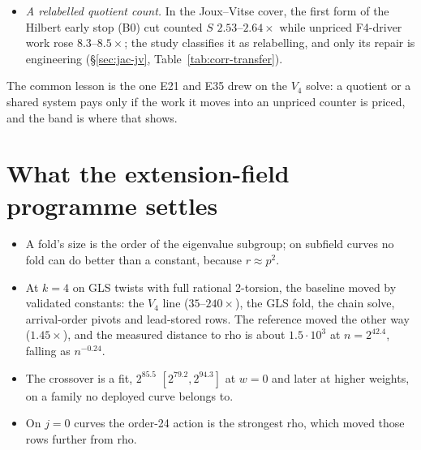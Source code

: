 \begin{itemize}
  would at most filter the eight cofactor lifts by a constant factor 2 or 4;
  a check on the $k=20$ Curve25519 miniature found the ``bits'' base in both
  descent classes (36\%/64\% at $t=5$, 40\%/60\% at $t=6$, 47\%/53\% at
  $t=9$), so no lift is excluded
  (). All
  values are \texttt{[pcc:unverified]}; there is no cost or rho
  comparison.
\item \emph{A relabelled quotient count.} In the Joux--Vitse cover, the
  first form of the Hilbert early stop (B0) cut counted $S$ $2.53$--$2.64\times$
  while unpriced F4-driver work rose $8.3$--$8.5\times$; the study classifies it as
  relabelling, and only its repair is engineering (\S\ref{sec:jac-jv},
  Table~\ref{tab:corr-transfer}).
\end{itemize}
The common lesson is the one E21 and E35 drew on the $V_4$ solve: a quotient
or a shared system pays only if the work it moves into an unpriced counter is
priced, and the band is where that shows.

\section{What the extension-field programme settles}\label{sec:glv-summary}

\begin{itemize}
\item A fold's size is the order of the eigenvalue subgroup; on subfield
  curves no fold can do better than a constant, because $r\approx p^2$.
\item At $k=4$ on GLS twists with full rational 2-torsion, the baseline moved
  by validated constants: the $V_4$ line ($35$--$240\times$), the GLS fold, the
  chain solve, arrival-order pivots and lead-stored rows. The reference moved
  the other way ($1.45\times$), and the measured distance to rho is about
  $1.5\cdot10^3$ at $n=2^{42.4}$, falling as $n^{-0.24}$.
\item The crossover is a fit, $2^{85.5}$ $[2^{79.2},2^{94.3}]$ at $w=0$ and later at
  higher weights, on a family no deployed curve belongs to.
\item On $j=0$ curves the order-24 action is the strongest rho, which moved
  those rows further from rho.
\end{itemize}
